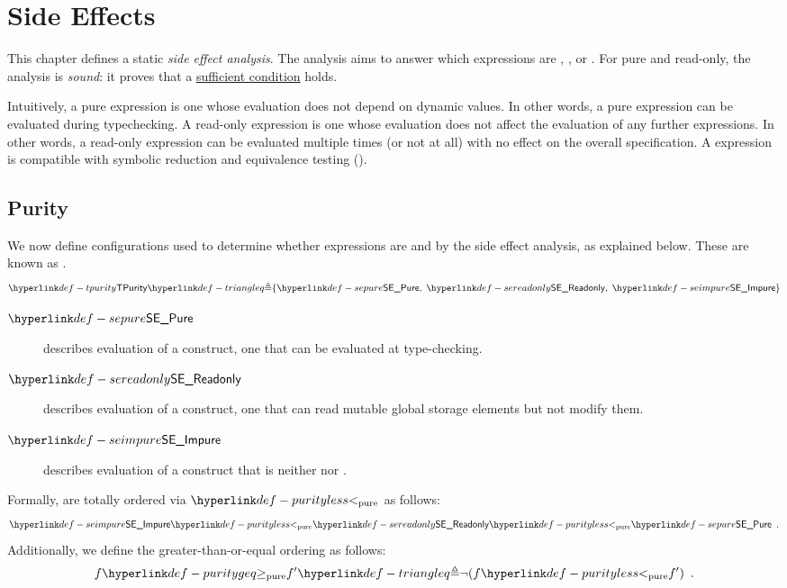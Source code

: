 \chapter{Side Effects\label{chap:SideEffects}}

This chapter defines a static \emph{side effect analysis}.
The analysis aims to answer which expressions are \pure{}, \readonly{}, or \symbolicallyevaluable{}.
For pure and read-only, the analysis is \emph{sound}: it proves that a \underline{sufficient condition} holds.

Intuitively, a pure expression is one whose evaluation does not depend on dynamic values.
In other words, a pure expression can be evaluated during typechecking.
A read-only expression is one whose evaluation does not affect the evaluation of any further expressions.
In other words, a read-only expression can be evaluated multiple times (or not at all) with no effect on the overall specification.
A \symbolicallyevaluable{} expression is compatible with symbolic reduction and equivalence testing ().


\section{Purity\label{sec:Purity}}

We now define configurations used to determine whether expressions are \pure{} and \readonly{} by the side effect analysis, as explained below.
These are known as \purities{}.
\hypertarget{def-tpurity}{}
\hypertarget{def-sepure}{}
\hypertarget{def-sereadonly}{}
\hypertarget{def-seimpure}{}
\[
\TPurity \triangleq \{ \SEPure,\; \SEReadonly,\; \SEImpure \}
\]
\begin{description}
    \item[$\SEPure$] describes evaluation of a \pure{} construct, one that can be evaluated at type-checking.
    \item[$\SEReadonly$] describes evaluation of a \readonly{} construct, one that can read mutable global storage elements but not modify them.
    \item[$\SEImpure$] describes evaluation of a construct that is neither \pure{} nor \readonly{}.
\end{description}

Formally, \purities{} are totally ordered via $\purityless$ as follows:
\hypertarget{def-purityless}{}
\[
\SEImpure \purityless \SEReadonly \purityless \SEPure \enspace.
\]
Additionally, we define the greater-than-or-equal ordering as follows:
\hypertarget{def-puritygeq}{}
\[
f \puritygeq f' \triangleq \lnot(f \purityless f') \enspace.
\]


